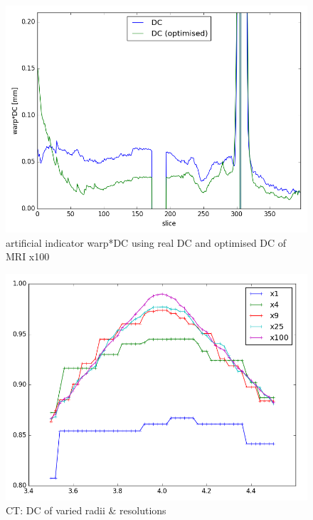 \documentclass[parskip,bibtotoc,final,twoside=false,titlepage,a4paper,english,12pt,titlepage,a4paper]{scrbook}
\begin{document}
\begin{figure}[!bp]
    \centering
    \includegraphics[scale=0.65]{python/warpDC/warpDC_x100.png}
    \caption{artificial indicator warp*DC using real DC and optimised DC of MRI x100}
    \label{fig:warpDC_x100}
\end{figure}
\begin{figure}[!bp]
  \centering
  \includegraphics[scale=0.65]{python/dice/CT-51iter.png}
  \caption{CT: DC of varied radii \& resolutions}
  \label{fig:CT_dc}
\end{figure}
\end{document}
